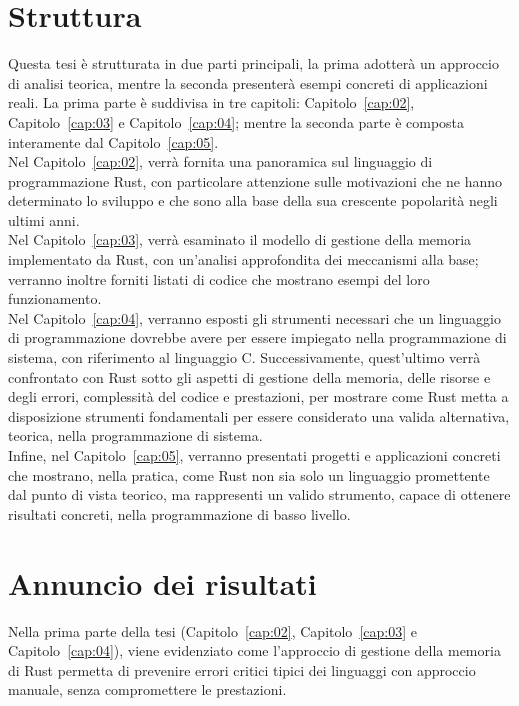 \section{Struttura} 
Questa tesi è strutturata in due parti principali, la prima adotterà un approccio di analisi teorica, mentre 
la seconda presenterà esempi concreti di applicazioni reali.
La prima parte è suddivisa in tre capitoli: Capitolo~\ref{cap:02}, Capitolo~\ref{cap:03} e Capitolo~\ref{cap:04}; mentre la seconda parte è composta interamente dal Capitolo~\ref{cap:05}. \hfill
\vspace{7pt}\\
\noindent Nel Capitolo~\ref{cap:02}, verrà fornita una panoramica sul linguaggio di programmazione Rust, con particolare attenzione sulle motivazioni 
che ne hanno determinato lo sviluppo e che sono alla base della sua crescente popolarità negli ultimi anni. \hfill
\vspace{7pt}\\
\noindent Nel Capitolo~\ref{cap:03}, verrà esaminato il modello di gestione della memoria implementato da Rust,
con un'analisi approfondita dei meccanismi alla base; verranno inoltre forniti listati di codice che mostrano esempi del loro funzionamento. \hfill
\vspace{7pt}\\
\noindent Nel Capitolo~\ref{cap:04}, verranno esposti gli strumenti necessari che un linguaggio di programmazione dovrebbe avere per essere impiegato 
nella programmazione di sistema, con riferimento al linguaggio C. 
Successivamente, quest'ultimo verrà confrontato con Rust sotto gli aspetti di 
gestione della memoria, delle risorse e degli errori, complessità del codice e prestazioni, per mostrare come Rust metta a disposizione strumenti 
fondamentali per essere considerato una valida alternativa, teorica, nella programmazione di sistema. \hfill
\vspace{7pt}\\
\noindent Infine, nel Capitolo~\ref{cap:05}, verranno presentati progetti e applicazioni concreti che mostrano, nella pratica, come 
Rust non sia solo un linguaggio promettente dal punto di vista teorico, ma rappresenti un valido strumento, capace di ottenere risultati concreti, nella programmazione di basso livello.

\section{Annuncio dei risultati}
Nella prima parte della tesi (Capitolo~\ref{cap:02}, Capitolo~\ref{cap:03} e Capitolo~\ref{cap:04}), viene evidenziato come l'approccio di gestione della memoria di Rust permetta 
di prevenire errori critici tipici dei linguaggi con approccio manuale, senza compromettere le prestazioni.

